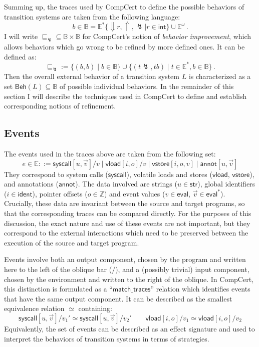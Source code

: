 \documentclass[11pt,oneside]{book}
\theoremstyle{definition}
\newcommand{\kw}[1]{\ensuremath{ \mathsf{#1} }}
\newcommand{\refby}{\sqsubseteq} %
\begin{document}
Summing up,
the traces used by CompCert to define
the possible behaviors of transition systems
are taken from the following language:
\[
  b \in \mathbb{B} =
    \mathbb{E}^*
      \{ {\Downarrow} r, {\Uparrow}, {\lightning} \mid r \in \kw{int} \}
      \cup
    \mathbb{E}^\omega
  \,.
\]
I will write
${\refby_\lightning} \subseteq \mathbb{B} \times \mathbb{B}$
for CompCert's notion of \emph{behavior improvement},
which allows behaviors which go wrong to
be refined by more defined ones.
It can be defined as:
\[
  {\refby_\lightning} := \{ (b, b) \mid b \in \mathbb{B} \}
    \cup \{ (t \lightning, t b) \mid
            t \in \mathbb{E}^*, b \in \mathbb{B} \}
  \,.
\]
Then the overall external behavior
of a transition system $L$
is characterized
as a set $\kw{Beh}(L) \subseteq \mathbb{B}$
of possible individual behaviors.
In the remainder of this section I will describe
the techniques used in CompCert to define and establish
corresponding notions of refinement.



\subsection{Events} %

The events used in the traces above are taken from the following set:
\[
  e \in \mathbb{E} ::=
    \kw{syscall}[u, \vec{v}]/v \mid
    \kw{vload}[i, o]/v \mid
    \kw{vstore}[i, o, v] \mid
    \kw{annot}[u, \vec{v}]
\]
They correspond to system calls ($\kw{syscall}$),
volatile loads and stores ($\kw{vload}$, $\kw{vstore}$),
and annotations ($\kw{annot}$).
The data involved
are strings ($u \in \kw{str}$),
global identifiers ($i \in \kw{ident}$),
pointer offsets ($o \in \mathbb{Z}$) and
event values ($v \in \kw{eval}$, $\vec{v} \in \kw{eval}^*$).
Crucially,
these data are invariant between the source and target programs,
so that the corresponding traces can be compared directly.
For the purposes of this discussion,
the exact nature and use of these events
are not important,
but they correspond to the external interactions
which need to be preserved between the execution
of the source and target program.

Events involve both an output component,
chosen by the program and
written here to the left of the oblique bar ($/$),
and a (possibly trivial) input component,
chosen by the environment and written to the right of the oblique.
In CompCert,
this distinction is formulated as a ``$\kw{match\_traces}$'' relation
which identifies events that have the same output component.
It can be described as the smallest equivalence relation $\simeq$
containing:
\[
  \kw{syscall}[u, \vec{v}]/v_1' \simeq
  \kw{syscall}[u, \vec{v}]/v_2'
  \qquad
  \kw{vload}[i, o]/v_1 \simeq
  \kw{vload}[i, o]/v_2
\]
Equivalently,
the set of events can be described as an effect signature
and used to interpret the behaviors of transition systems
in terms of strategies.
\end{document}
